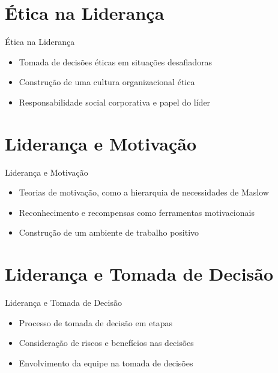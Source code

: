\documentclass[aspectratio=169,xcolor=dvipsnames]{beamer}
\begin{document}
\section{Ética na Liderança}

\begin{frame}{Ética na Liderança}
	\begin{itemize}
		\item Tomada de decisões éticas em situações desafiadoras
		\item Construção de uma cultura organizacional ética
		\item Responsabilidade social corporativa e papel do líder

	\end{itemize}
\end{frame}

\section{Liderança e Motivação}

\begin{frame}{Liderança e Motivação}
	\begin{itemize}
		\item Teorias de motivação, como a hierarquia de necessidades de Maslow
		\item Reconhecimento e recompensas como ferramentas motivacionais
		\item Construção de um ambiente de trabalho positivo

	\end{itemize}
\end{frame}

\section{Liderança e Tomada de Decisão}

\begin{frame}{Liderança e Tomada de Decisão}
	\begin{itemize}
		\item Processo de tomada de decisão em etapas
		\item Consideração de riscos e benefícios nas decisões
		\item Envolvimento da equipe na tomada de decisões

	\end{itemize}
\end{frame}
\end{document}
